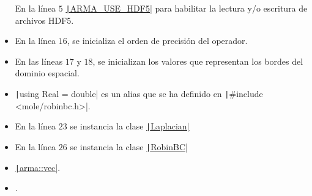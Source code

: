 \begin{problem}
\begin{itemize}
        En la línea $5$
        \href{https://arma.sourceforge.net/docs.html#config_hpp}{\texttt|ARMA_USE_HDF5|}
        para habilitar la lectura y/o escritura de archivos HDF5.

  \item

        En la línea $16$, se inicializa el orden de precisión del
        operador.

  \item

        En las líneas $17$ y $18$, se inicializan los valores que
        representan los bordes del dominio espacial.

  \item

        \texttt|using Real = double| es un alias que se ha
        definido en \texttt|#include <mole/robinbc.h>|.

  \item

        En la línea $23$ se instancia la clase
        \href{https://carlosal1015.github.io/mole_examples/api_docs/cpp/html/classLaplacian.html}{\texttt|Laplacian|}

  \item

        En la línea $26$ se instancia la clase
        \href{https://carlosal1015.github.io/mole_examples/api_docs/cpp/html/classRobinBC.html}{\texttt|RobinBC|}

  \item

        \href{https://arma.sourceforge.net/docs.html#Col}{\texttt|arma::vec|}.

  \item

        .
\end{itemize}
\noQED %
\end{problem}

